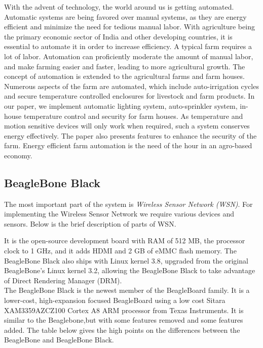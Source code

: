 \documentclass[10pt,a4paper]{article}
\begin{document}
\quad 
 With the advent of technology, the world around us is getting automated. Automatic systems are being favored over manual systems, as they are energy efficient and minimize the need for tedious manual labor. With agriculture being the primary economic sector of India and other developing countries, it is essential to automate it in order to increase efficiency. A typical farm requires a lot of labor. Automation can proficiently moderate the amount of manual labor, and make farming easier and faster, leading to more agricultural growth. The concept of automation is extended to the agricultural farms and farm houses. Numerous aspects of the farm are automated, which include auto-irrigation cycles and secure temperature controlled enclosures for livestock and farm products. In our paper, we implement automatic lighting system, auto-sprinkler system, in-house temperature control and security for farm houses. As temperature and motion sensitive devices will only work when required, such a system conserves energy effectively. The paper also presents features to enhance the security of the farm. Energy efficient farm automation is the need of the hour in an agro-based economy. \cite{8}


\subsection{BeagleBone Black}

\quad
The most important part of the system is \textit{Wireless Sensor Network (WSN)}. For implementing the Wireless Sensor Network we require various devices and sensors. Below is the brief description of parts of WSN. \cite{9}

\quad
It is the open-source development board with RAM of 512 MB, the processor clock to 1 GHz, and it adds HDMI and 2 GB of eMMC flash memory. The BeagleBone Black also ships with Linux kernel 3.8, upgraded from the original BeagleBone's Linux kernel 3.2, allowing the BeagleBone Black to take advantage of Direct Rendering Manager (DRM).\\
The BeagleBone Black is the newest member of the BeagleBoard family. It is a lower-cost, high-expansion focused BeagleBoard using a low cost Sitara XAM3359AZCZ100 Cortex A8 ARM processor from Texas Instruments. It is similar to the Beaglebone,but with some features removed and some features added. The table below gives the high points on the differences between the BeagleBone and BeagleBone Black.\cite{5}
\end{document}
